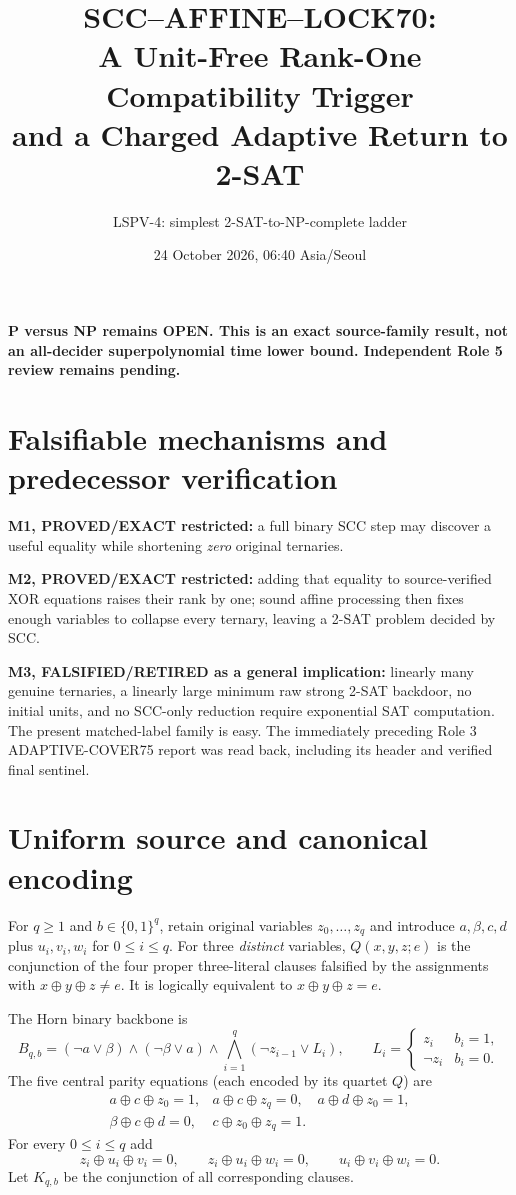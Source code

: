 \documentclass[11pt]{article}
\title{SCC--AFFINE--LOCK70:\\A Unit-Free Rank-One Compatibility Trigger\\and a Charged Adaptive Return to 2-SAT}
\author{LSPV-4: simplest 2-SAT-to-NP-complete ladder}
\date{24 October 2026, 06:40 Asia/Seoul}
\begin{document}
\maketitle
\begin{center}\textbf{P versus NP remains OPEN. This is an exact source-family
result, not an all-decider superpolynomial time lower bound.
Independent Role 5 review remains pending.}\end{center}

\section{Falsifiable mechanisms and predecessor verification}
\noindent\textbf{M1, PROVED/EXACT restricted:}
a full binary SCC step may discover a useful equality while shortening
\emph{zero} original ternaries. 
\par\noindent\textbf{M2, PROVED/EXACT restricted:}
adding that equality to source-verified XOR equations raises their rank
by one; sound affine processing then fixes enough variables to collapse
every ternary, leaving a 2-SAT problem decided by SCC.
\par\noindent\textbf{M3, FALSIFIED/RETIRED as a general implication:}
linearly many genuine ternaries, a linearly large minimum raw strong
2-SAT backdoor, no initial units, and no SCC-only reduction require
exponential SAT computation.  The present matched-label family is easy.
The immediately preceding Role 3 ADAPTIVE-COVER75 report was read back,
including its header and verified final sentinel.

\section{Uniform source and canonical encoding}
For $q\ge1$ and $b\in\{0,1\}^q$, retain original variables
$z_0,\ldots,z_q$ and introduce $a,\beta,c,d$ plus $u_i,v_i,w_i$
for $0\le i\le q$.  For three \emph{distinct} variables,
$Q(x,y,z;e)$ is the conjunction of the four proper three-literal
clauses falsified by the assignments with $x\oplus y\oplus z\ne e$.
It is logically equivalent to $x\oplus y\oplus z=e$.

The Horn binary backbone is
\[
 B_{q,b}=(\neg a\vee\beta)\wedge(\neg\beta\vee a)
 \wedge\bigwedge_{i=1}^{q}(\neg z_{i-1}\vee L_i),\qquad
 L_i=\begin{cases}z_i&b_i=1,\\\neg z_i&b_i=0.\end{cases}
\tag{1}
\]
The five central parity equations (each encoded by its quartet $Q$) are
\[
\begin{array}{lll}
 a\oplus c\oplus z_0=1,&a\oplus c\oplus z_q=0,&
 a\oplus d\oplus z_0=1,\\
 \beta\oplus c\oplus d=0,&c\oplus z_0\oplus z_q=1.&
\end{array} \tag{2}
\]
For every $0\le i\le q$ add
\[
z_i\oplus u_i\oplus v_i=0,\qquad
z_i\oplus u_i\oplus w_i=0,\qquad
u_i\oplus v_i\oplus w_i=0. \tag{3}
\]
Let $K_{q,b}$ be the conjunction of all corresponding clauses.
\end{document}
